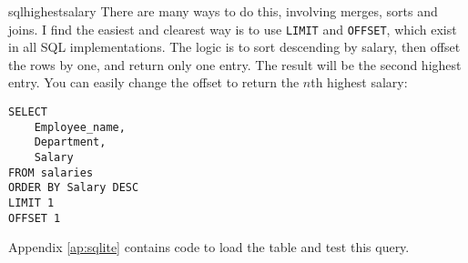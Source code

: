 \begin{subanswer}{sqlhighestsalary}
There are many ways to do this, involving merges, sorts and joins.
I find the easiest and clearest way is to use \verb+LIMIT+ and \verb+OFFSET+, which exist in all SQL implementations.
The logic is to sort descending by salary, then offset the rows by one, and return only one entry.
The result will be the second highest entry.
You can easily change the offset to return the $n$th highest salary:
\begin{verbatim}
SELECT
    Employee_name,
    Department,
    Salary
FROM salaries
ORDER BY Salary DESC
LIMIT 1
OFFSET 1
\end{verbatim}
Appendix \ref{ap:sqlite} contains code to load the table and test this query.
\end{subanswer}
